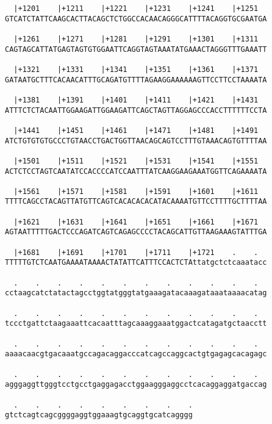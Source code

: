\documentclass{article}
\begin{document}
\begin{Verbatim}
  |+1201    |+1211    |+1221    |+1231    |+1241    |+1251  
GTCATCTATTCAAGCACTTACAGCTCTGGCCACAACAGGGCATTTTACAGGTGCGAATGA
                                                            
  |+1261    |+1271    |+1281    |+1291    |+1301    |+1311  
CAGTAGCATTATGAGTAGTGTGGAATTCAGGTAGTAAATATGAAACTAGGGTTTGAAATT
                                                            
  |+1321    |+1331    |+1341    |+1351    |+1361    |+1371  
GATAATGCTTTCACAACATTTGCAGATGTTTTAGAAGGAAAAAAGTTCCTTCCTAAAATA
                                                            
  |+1381    |+1391    |+1401    |+1411    |+1421    |+1431  
ATTTCTCTACAATTGGAAGATTGGAAGATTCAGCTAGTTAGGAGCCCACCTTTTTTCCTA
                                                            
  |+1441    |+1451    |+1461    |+1471    |+1481    |+1491  
ATCTGTGTGTGCCCTGTAACCTGACTGGTTAACAGCAGTCCTTTGTAAACAGTGTTTTAA
                                                            
  |+1501    |+1511    |+1521    |+1531    |+1541    |+1551  
ACTCTCCTAGTCAATATCCACCCCATCCAATTTATCAAGGAAGAAATGGTTCAGAAAATA
                                                            
  |+1561    |+1571    |+1581    |+1591    |+1601    |+1611  
TTTTCAGCCTACAGTTATGTTCAGTCACACACACATACAAAATGTTCCTTTTGCTTTTAA
                                                            
  |+1621    |+1631    |+1641    |+1651    |+1661    |+1671  
AGTAATTTTTGACTCCCAGATCAGTCAGAGCCCCTACAGCATTGTTAAGAAAGTATTTGA
                                                            
  |+1681    |+1691    |+1701    |+1711    |+1721    .    .  
TTTTTGTCTCAATGAAAATAAAACTATATTCATTTCCACTCTAttatgctctcaaatacc
                                                            
  .    .    .    .    .    .    .    .    .    .    .    .  
cctaagcatctatactagcctggtatgggtatgaaagatacaaagataaataaaacatag
                                                            
  .    .    .    .    .    .    .    .    .    .    .    .  
tccctgattctaagaaattcacaatttagcaaaggaaatggactcatagatgctaacctt
                                                            
  .    .    .    .    .    .    .    .    .    .    .    .  
aaaacaacgtgacaaatgccagacaggacccatcagccaggcactgtgagagcacagagc
                                                            
  .    .    .    .    .    .    .    .    .    .    .    .  
agggaggttgggtcctgcctgaggagacctggaagggaggcctcacaggaggatgaccag
                                                            
  .    .    .    .    .    .    .    .    .
gtctcagtcagcggggaggtggaaagtgcaggtgcatcagggg
                                           
                                           
\end{Verbatim}
\end{document}
